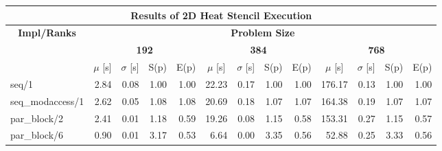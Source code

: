 \begin{tabular}{|lllllllllllll|}
\hline
\multicolumn{13}{|c|}{\textbf{Results of 2D Heat Stencil Execution}} \\ \hline
\multicolumn{1}{|c|}{\textbf{Impl/Ranks}} & \multicolumn{12}{c|}{\textbf{Problem Size}} \\ \hline
\multicolumn{1}{|c|}{\textbf{}} & \multicolumn{4}{c|}{\textbf{192}} & \multicolumn{4}{c|}{\textbf{384}} & \multicolumn{4}{c|}{\textbf{768}} \\ \hline
\multicolumn{1}{|l|}{} & \multicolumn{1}{c|}{$\mu$ [s]} & \multicolumn{1}{c|}{$\sigma$ [s]} & \multicolumn{1}{c|}{S(p)} & \multicolumn{1}{c|}{E(p)} & \multicolumn{1}{c|}{$\mu$ [s]} & \multicolumn{1}{c|}{$\sigma$ [s]} & \multicolumn{1}{c|}{S(p)} & \multicolumn{1}{c|}{E(p)} & \multicolumn{1}{c|}{$\mu$ [s]} & \multicolumn{1}{c|}{$\sigma$ [s]} & \multicolumn{1}{c|}{S(p)} & \multicolumn{1}{c|}{E(p)} \\ \hline
\multicolumn{1}{|l|}{seq/1}  & \multicolumn{1}{r|}{2.84} & \multicolumn{1}{r|}{0.08} & \multicolumn{1}{r|}{1.00} & \multicolumn{1}{r|}{1.00}  & \multicolumn{1}{r|}{22.23} & \multicolumn{1}{r|}{0.17} & \multicolumn{1}{r|}{1.00} & \multicolumn{1}{r|}{1.00}  & \multicolumn{1}{r|}{176.17} & \multicolumn{1}{r|}{0.13} & \multicolumn{1}{r|}{1.00} & \multicolumn{1}{r|}{1.00}  \\ \hline
\multicolumn{1}{|l|}{seq\_modaccess/1}  & \multicolumn{1}{r|}{2.62} & \multicolumn{1}{r|}{0.05} & \multicolumn{1}{r|}{1.08} & \multicolumn{1}{r|}{1.08}  & \multicolumn{1}{r|}{20.69} & \multicolumn{1}{r|}{0.18} & \multicolumn{1}{r|}{1.07} & \multicolumn{1}{r|}{1.07}  & \multicolumn{1}{r|}{164.38} & \multicolumn{1}{r|}{0.19} & \multicolumn{1}{r|}{1.07} & \multicolumn{1}{r|}{1.07}  \\ \hline
\multicolumn{1}{|l|}{par\_block/2}  & \multicolumn{1}{r|}{2.41} & \multicolumn{1}{r|}{0.01} & \multicolumn{1}{r|}{1.18} & \multicolumn{1}{r|}{0.59}  & \multicolumn{1}{r|}{19.26} & \multicolumn{1}{r|}{0.08} & \multicolumn{1}{r|}{1.15} & \multicolumn{1}{r|}{0.58}  & \multicolumn{1}{r|}{153.31} & \multicolumn{1}{r|}{0.27} & \multicolumn{1}{r|}{1.15} & \multicolumn{1}{r|}{0.57}  \\ \hline
\multicolumn{1}{|l|}{par\_block/6}  & \multicolumn{1}{r|}{0.90} & \multicolumn{1}{r|}{0.01} & \multicolumn{1}{r|}{3.17} & \multicolumn{1}{r|}{0.53}  & \multicolumn{1}{r|}{6.64} & \multicolumn{1}{r|}{0.00} & \multicolumn{1}{r|}{3.35} & \multicolumn{1}{r|}{0.56}  & \multicolumn{1}{r|}{52.88} & \multicolumn{1}{r|}{0.25} & \multicolumn{1}{r|}{3.33} & \multicolumn{1}{r|}{0.56}  \\ \hline

\end{tabular}
